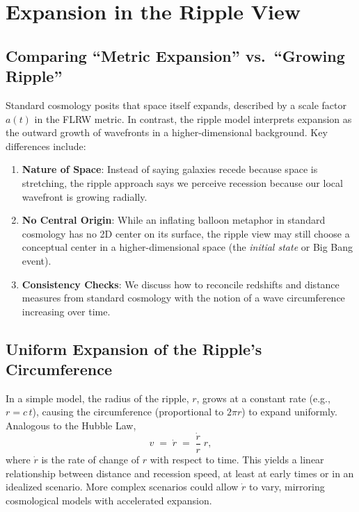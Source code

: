 \documentclass[11pt]{article}
\begin{document}
\section{Expansion in the Ripple View}
\label{sec:expansion-ripple}

\subsection{Comparing ``Metric Expansion'' vs.\ ``Growing Ripple''}
\label{subsec:metric-vs-ripple}
Standard cosmology posits that space itself expands, described by 
a scale factor \(a(t)\) in the FLRW metric. In contrast, the ripple 
model interprets expansion as the outward growth of wavefronts in 
a higher-dimensional background. Key differences include:
\begin{enumerate}
  \item \textbf{Nature of Space}: Instead of saying galaxies recede 
        because space is stretching, the ripple approach says we 
        perceive recession because our local wavefront is growing 
        radially.
  \item \textbf{No Central Origin}: While an inflating balloon 
        metaphor in standard cosmology has no 2D center on its 
        surface, the ripple view may still choose a conceptual 
        center in a higher-dimensional space (the \textit{initial 
        state} or Big Bang event).
  \item \textbf{Consistency Checks}: We discuss how to reconcile 
        redshifts and distance measures from standard cosmology 
        with the notion of a wave circumference increasing over time.
\end{enumerate}

\subsection{Uniform Expansion of the Ripple's Circumference}
\label{subsec:uniform-expansion}
In a simple model, the radius of the ripple, \(r\), grows at a constant 
rate (e.g., \(r = c\,t\)), causing the circumference (proportional to 
\(2\pi r\)) to expand uniformly. Analogous to the Hubble Law,
\[
  v \;=\; \dot{r} \;=\; \frac{\dot{r}}{r}\;r,
\]
where \(\dot{r}\) is the rate of change of \(r\) with respect to time. 
This yields a linear relationship between distance and recession speed, 
at least at early times or in an idealized scenario. More complex 
scenarios could allow \(\dot{r}\) to vary, mirroring cosmological 
models with accelerated expansion.
\end{document}
